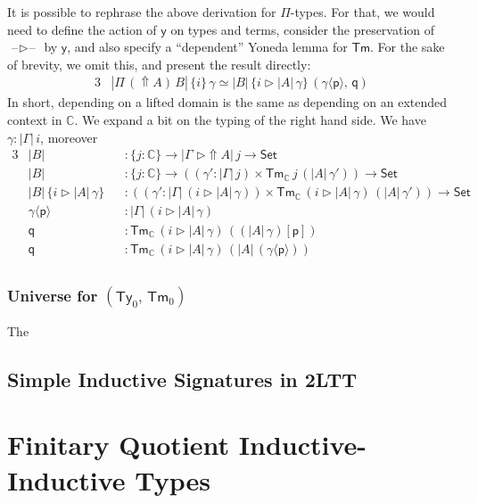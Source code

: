 \documentclass[12pt,a4paper,twoside,openany]{book}
\theoremstyle{remark}
\theoremstyle{definition}
\newcommand{\ms}[1]{\mathsf{#1}}
\newcommand{\mbb}[1]{\mathbb{#1}}
\newcommand{\Tm}{\mathsf{Tm}}
\newcommand{\Ty}{\mathsf{Ty}}
\newcommand{\blank}{\mathord{\hspace{1pt}\text{--}\hspace{1pt}}}
\newcommand{\Set}{\mathsf{Set}}
\newcommand{\Lift}{\Uparrow}
\newcommand{\ext}{\triangleright}
\newcommand{\p}{\mathsf{p}}
\newcommand{\q}{\mathsf{q}}
\newcommand{\mbbC}{\mbb{C}}
\newcommand{\lab}{\langle}
\newcommand{\rab}{\rangle}
\newcommand{\yon}{\ms{y}}
\begin{document}
It is possible to rephrase the above derivation for $\Pi$-types. For that, we
would need to define the action of $\yon$ on types and terms, consider the
preservation of $\blank\ext\blank$ by $\yon$, and also specify a ``dependent''
Yoneda lemma for $\Tm$. For the sake of brevity, we omit this, and present the
result directly:
\begin{alignat*}{3}
  & |\Pi\,(\Lift\!A)\,B|\,\{i\}\,\gamma \simeq |B|\,\{i \ext |A|\,\gamma\}\,(\gamma\!\lab\!\p\!\rab,\,\q)
\end{alignat*}
In short, depending on a lifted domain is the same as depending on an extended
context in $\mbbC$.  We expand a bit on the typing of the right hand side. We
have $\gamma : |\Gamma|\,i$, moreover
\begin{alignat*}{3}
  & |B| &&: \{j : \mbbC\} \to |\Gamma\,\,\ext \Lift\!A|\,j \to \Set\\
  & |B| &&: \{j : \mbbC\} \to ((\gamma' : |\Gamma|\,j)\times \Tm_{\mbbC}\,j\,(|A|\,\gamma')) \to \Set\\
  & |B|\,\{i \ext |A|\,\gamma\} &&: ((\gamma' : |\Gamma|\,(i \ext |A|\,\gamma))\times \Tm_{\mbbC}\,(i \ext |A|\,\gamma)\,(|A|\,\gamma')) \to \Set\\
  & \gamma\!\lab\!\p\!\rab &&: |\Gamma|\,(i \ext |A|\,\gamma)\\
  & \q &&: \Tm_{\mbbC}\,(i \ext |A|\,\gamma)\,((|A|\,\gamma)[\p])\\
  & \q &&: \Tm_{\mbbC}\,(i \ext |A|\,\gamma)\,(|A|\,(\gamma\!\lab\!\p\!\rab))\\
\end{alignat*}

\subsection{Universe for $(\Ty_0,\,\Tm_0)$}

The




\section{Simple Inductive Signatures in 2LTT}
\label{sec:2ltt-simple-signatures}



\chapter{Finitary Quotient Inductive-Inductive Types}
\label{chap:fqiit}
\end{document}
